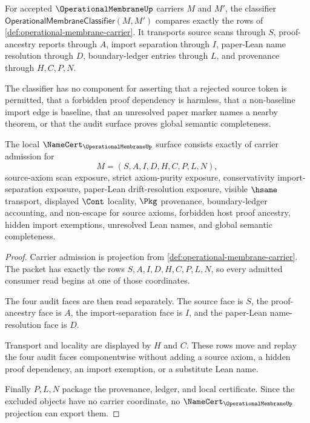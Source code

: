 \begin{definition}
\label{def:operational-membrane-classifier}
For accepted $\OperationalMembraneUp$ carriers $M$ and $M'$, the classifier $\mathsf{OperationalMembraneClassifier}(M,M')$ compares exactly the rows of \autoref{def:operational-membrane-carrier}. It transports source scans through $S$, proof-ancestry reports through $A$, import separation through $I$, paper-Lean name resolution through $D$, boundary-ledger entries through $L$, and provenance through $H,C,P,N$.

The classifier has no component for asserting that a rejected source token is permitted, that a forbidden proof dependency is harmless, that a non-baseline import edge is baseline, that an unresolved paper marker names a nearby theorem, or that the audit surface proves global semantic completeness.
\end{definition}

\begin{theorem}
\label{thm:operational-membrane-namecert-obligation-surface}
The local $\NameCert_{\OperationalMembraneUp}$ surface consists exactly of carrier admission for
$$
M=(S,A,I,D,H,C,P,L,N),
$$
source-axiom scan exposure, strict axiom-purity exposure, conservativity import-separation exposure, paper-Lean drift-resolution exposure, visible $\hsame$ transport, displayed $\Cont$ locality, $\Pkg$ provenance, boundary-ledger accounting, and non-escape for source axioms, forbidden host proof ancestry, hidden import exemptions, unresolved Lean names, and global semantic completeness.
\end{theorem}
\begin{proof}
Carrier admission is projection from \autoref{def:operational-membrane-carrier}. The packet has exactly the rows $S,A,I,D,H,C,P,L,N$, so every admitted consumer read begins at one of those coordinates.

The four audit faces are then read separately. The source face is $S$, the proof-ancestry face is $A$, the import-separation face is $I$, and the paper-Lean name-resolution face is $D$.

Transport and locality are displayed by $H$ and $C$. These rows move and replay the four audit faces componentwise without adding a source axiom, a hidden proof dependency, an import exemption, or a substitute Lean name.

Finally $P,L,N$ package the provenance, ledger, and local certificate. Since the excluded objects have no carrier coordinate, no $\NameCert_{\OperationalMembraneUp}$ projection can export them.
\end{proof}

